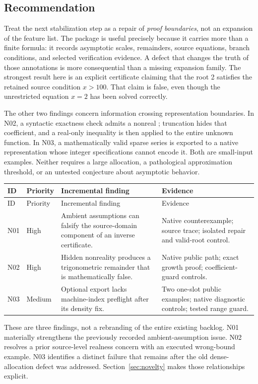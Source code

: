 \documentclass[11pt,a4paper]{article}
\newcommand{\code}[1]{\texttt{\detokenize{#1}}}
\begin{document}
\subsection{Recommendation}
Treat the next stabilization step as a repair of \emph{proof boundaries}, not an expansion of the feature list. The package is useful precisely because it carries more than a finite formula: it records asymptotic scales, remainders, source equations, branch conditions, and selected verification evidence. A defect that changes the truth of those annotations is more consequential than a missing expansion family. The strongest result here is an explicit certificate claiming that the root 2 satisfies the retained source condition \(x>100\). That claim is false, even though the unrestricted equation \(x=2\) has been solved correctly.

The other two findings concern information crossing representation boundaries. In N02, a syntactic exactness check admits a nonreal \code{Root}; truncation hides that coefficient, and a real-only inequality is then applied to the entire unknown function. In N03, a mathematically valid sparse series is exported to a native representation whose integer specifications cannot encode it. Both are small-input examples. Neither requires a large allocation, a pathological approximation threshold, or an untested conjecture about asymptotic behavior.

\begin{longtable}{@{}P{0.07\textwidth}P{0.12\textwidth}P{0.49\textwidth}P{0.24\textwidth}@{}}
\toprule ID & Priority & Incremental finding & Evidence\\\midrule\endfirsthead
\toprule ID & Priority & Incremental finding & Evidence\\\midrule\endhead
N01 & High & Ambient assumptions can falsify the source-domain component of an inverse certificate. & Native counterexample; source trace; isolated repair and valid-root control.\\
N02 & High & Hidden nonreality produces a trigonometric remainder that is mathematically false. & Native public path; exact growth proof; coefficient-guard controls.\\
N03 & Medium & Optional \code{SeriesData} export lacks machine-index preflight after its density fix. & Two one-slot public examples; native diagnostic controls; tested range guard.\\
\bottomrule
\end{longtable}

These are three findings, not a rebranding of the entire existing backlog. N01 materially strengthens the previously recorded ambient-assumption issue. N02 resolves a prior source-level realness concern with an executed wrong-bound example. N03 identifies a distinct failure that remains after the old dense-allocation defect was addressed. Section~\ref{sec:novelty} makes those relationships explicit.
\end{document}
